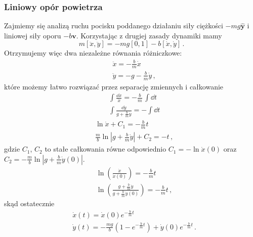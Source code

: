 \documentclass[../main.tex]{subfiles}
\begin{document}
\subsubsection*{Liniowy opór powietrza}
Zajmiemy się analizą ruchu pocisku poddanego działaniu siły ciężkości \(-mg\mathbf{\hat y}\) i
liniowej siły oporu \(-b\mathbf{v}\). Korzystając z drugiej zasady dynamiki mamy
\begin{equation*}
    m[\ddot x,\ddot y]=-mg[0,1]-b[\dot x,\dot y]\,.
\end{equation*}
Otrzymujemy więc dwa niezależne równania różniczkowe:
\begin{equation*}
    \begin{split}
        &\ddot x=-\frac{b}{m}\dot x\\
        &\ddot y=-g-\frac{b}{m}\dot y\,,
    \end{split}
\end{equation*}
które możemy łatwo rozwiązać przez separację zmiennych i całkowanie  
\begin{equation*}
    \begin{split}
        &\int\frac{\dd\dot x}{\dot x}=-\frac{b}{m}\,\int \dd t\\
        &\int\frac{\dd\dot y}{g+\frac{b}{m}\dot y}=-\int \dd t
    \end{split}
\end{equation*}
\begin{equation*}
    \begin{split}
        &\ln\dot x+C_1=-\frac{b}{m}t\\
        &\frac{m}{b}\ln\left|g+\frac{b}{m}\dot y\right|+C_2=-t\,,
    \end{split}
\end{equation*}
gdzie \(C_1\), \(C_2\) to stałe całkowania równe odpowiednio \(C_1=-\ln\dot x(0)\) oraz
\(C_2=-\frac{m}{b}\ln|g+\frac{b}{m}\dot y(0)|\).
\begin{equation*}
\begin{split}
    &\ln\left(\frac{\dot x}{\dot x(0)}\right)=-\frac{b}{m}t\\
    &\ln\left(\frac{g+\frac{b}{m}\dot y}{g+\frac{b}{m}\dot y(0)}\right)=-\frac{b}{m}t\,,
\end{split}
\end{equation*}
skąd ostatecznie
\begin{equation*}
    \begin{split}
        &\dot x(t)=\dot x(0)e^{-\frac{b}{m}t}\\
        &\dot y(t)=-\frac{mg}{b}\left(1-e^{-\frac{b}{m}t}\right)+\dot y(0)e^{-\frac{b}{m}t}\,.
    \end{split}
\end{equation*}
\end{document}
